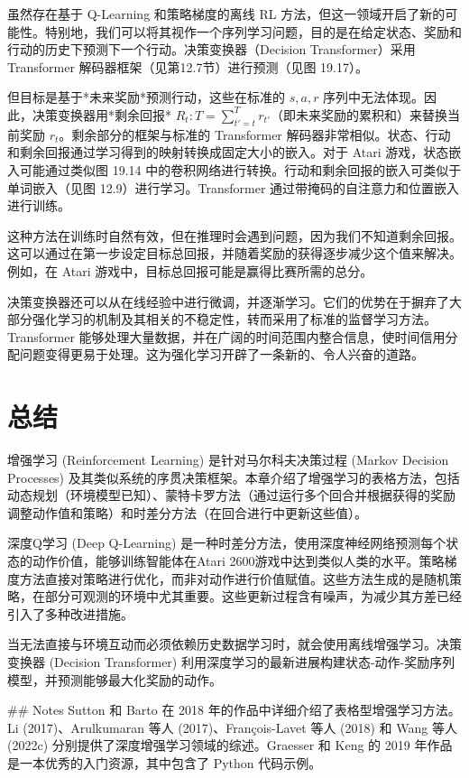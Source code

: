 虽然存在基于 Q-Learning 和策略梯度的离线 RL 方法，但这一领域开启了新的可能性。特别地，我们可以将其视作一个序列学习问题，目的是在给定状态、奖励和行动的历史下预测下一个行动。决策变换器（Decision Transformer）采用 Transformer 解码器框架（见第12.7节）进行预测（见图 19.17）。

但目标是基于*未来奖励*预测行动，这些在标准的 \(s, a, r\) 序列中无法体现。因此，决策变换器用*剩余回报* \(R_t:T = \sum_{t'=t}^T r_{t'}\)（即未来奖励的累积和）来替换当前奖励 \(r_t\)。剩余部分的框架与标准的 Transformer 解码器非常相似。状态、行动和剩余回报通过学习得到的映射转换成固定大小的嵌入。对于 Atari 游戏，状态嵌入可能通过类似图 19.14 中的卷积网络进行转换。行动和剩余回报的嵌入可类似于单词嵌入（见图 12.9）进行学习。Transformer 通过带掩码的自注意力和位置嵌入进行训练。

这种方法在训练时自然有效，但在推理时会遇到问题，因为我们不知道剩余回报。这可以通过在第一步设定目标总回报，并随着奖励的获得逐步减少这个值来解决。例如，在 Atari 游戏中，目标总回报可能是赢得比赛所需的总分。

决策变换器还可以从在线经验中进行微调，并逐渐学习。它们的优势在于摒弃了大部分强化学习的机制及其相关的不稳定性，转而采用了标准的监督学习方法。Transformer 能够处理大量数据，并在广阔的时间范围内整合信息，使时间信用分配问题变得更易于处理。这为强化学习开辟了一条新的、令人兴奋的道路。

\section{总结}
增强学习 (Reinforcement Learning) 是针对马尔科夫决策过程 (Markov Decision Processes) 及其类似系统的序贯决策框架。本章介绍了增强学习的表格方法，包括动态规划（环境模型已知）、蒙特卡罗方法（通过运行多个回合并根据获得的奖励调整动作值和策略）和时差分方法（在回合进行中更新这些值）。

深度Q学习 (Deep Q-Learning) 是一种时差分方法，使用深度神经网络预测每个状态的动作价值，能够训练智能体在Atari 2600游戏中达到类似人类的水平。策略梯度方法直接对策略进行优化，而非对动作进行价值赋值。这些方法生成的是随机策略，在部分可观测的环境中尤其重要。这些更新过程含有噪声，为减少其方差已经引入了多种改进措施。

当无法直接与环境互动而必须依赖历史数据学习时，就会使用离线增强学习。决策变换器 (Decision Transformer) 利用深度学习的最新进展构建状态-动作-奖励序列模型，并预测能够最大化奖励的动作。


## Notes
Sutton 和 Barto 在 2018 年的作品中详细介绍了表格型增强学习方法。Li (2017)、Arulkumaran 等人 (2017)、François-Lavet 等人 (2018) 和 Wang 等人 (2022c) 分别提供了深度增强学习领域的综述。Graesser 和 Keng 的 2019 年作品是一本优秀的入门资源，其中包含了 Python 代码示例。

